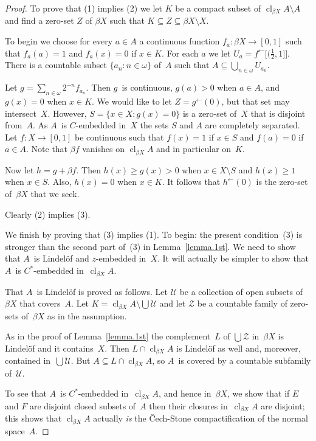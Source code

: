 \documentclass[a4paper]{amsart}
\newcommand\calU{\mathcal{U}}
\newcommand\calZ{\mathcal{Z}}
\newcommand\cl{\operatorname{cl}}
\newcommand\clbeta[1][X]{\cl_{\beta #1}}
\newcommand\preim{^\gets}
\theoremstyle{plain}
\theoremstyle{definition}
\theoremstyle{remark}
\begin{document}
\begin{proof}
To prove that (1) implies (2) we let $K$ be a compact subset 
of $\clbeta A\setminus A$ and find a zero-set $Z$ of $\beta X$ such 
that $K\subseteq Z\subseteq\beta X\setminus X$.

To begin we choose for every $a\in A$ a continuous function 
$f_a:\beta X\to[0,1]$ such that $f_a(a)=1$ and $f_a(x)=0$ if $x\in K$.
For each $a$ we let $U_a=f\preim\bigl[(\frac12,1]\bigr]$.
There is a countable subset $\{a_n:n\in\omega\}$ of~$A$ such 
that $A\subseteq\bigcup_{n\in\omega}U_{a_n}$.

Let $g=\sum_{n\in\omega}2^{-n}f_{a_n}$.
Then $g$~is continuous, $g(a)>0$ when $a\in A$, and $g(x)=0$ when $x\in K$.
We would like to let $Z=g\preim(0)$, but that set may intersect~$X$.
However, $S=\{x\in X:g(x)=0\}$ is a zero-set of~$X$ that is disjoint from~$A$.
As $A$~is $C$-embedded in~$X$ the sets $S$ and $A$ are completely separated.
Let $f:X\to[0,1]$ be continuous such that $f(x)=1$ if $x\in S$ and $f(a)=0$
if $a\in A$.
Note that $\beta f$ vanishes on $\clbeta A$ and in particular on~$K$.

Now let $h=g+\beta f$.
Then $h(x)\ge g(x)>0$ when $x\in X\setminus S$ and
$h(x)\ge1$ when $x\in S$.
Also, $h(x)=0$ when $x\in K$.
It follows that $h\preim(0)$ is the zero-set of~$\beta X$ that we seek.

\medskip
Clearly (2) implies (3).

\medskip
We finish by proving that (3) implies (1).   
To begin: the present condition~(3) is stronger than the second part of~(3)
in Lemma~\ref{lemma.1st}.
We need to show that $A$~is Lindel\"of and $z$-embedded in~$X$.
It will actually be simpler to show that $A$~is $C^*$-embedded in~$\clbeta A$.

\smallskip
That $A$~is Lindel\"of is proved as follows.
Let $\calU$ be a collection of open subsets of~$\beta X$ that covers~$A$.
Let $K=\clbeta A\setminus\bigcup\calU$ and let $\calZ$ be a countable
family of zero-sets of~$\beta X$ as in the assumption.

As in the proof of Lemma~\ref{lemma.1st} the complement~$L$ of
$\bigcup\calZ$ in~$\beta X$ is Lindel\"of and it contains~$X$.
Then $L\cap\clbeta A$ is Lindel\"of as well and, moreover,
contained in~$\bigcup\calU$.
But $A\subseteq L\cap\clbeta A$, so $A$~is covered by a countable
subfamily of~$\calU$.

\smallskip
To see that $A$~is $C^*$-embedded in~$\clbeta A$, and hence in~$\beta X$,
we show that if $E$ and $F$ are disjoint closed subsets of~$A$ then their 
closures in~$\clbeta A$ are disjoint; this shows that $\clbeta A$ actually
\emph{is} the \v{C}ech-Stone compactification of the normal space~$A$.


\end{proof}
\end{document}
